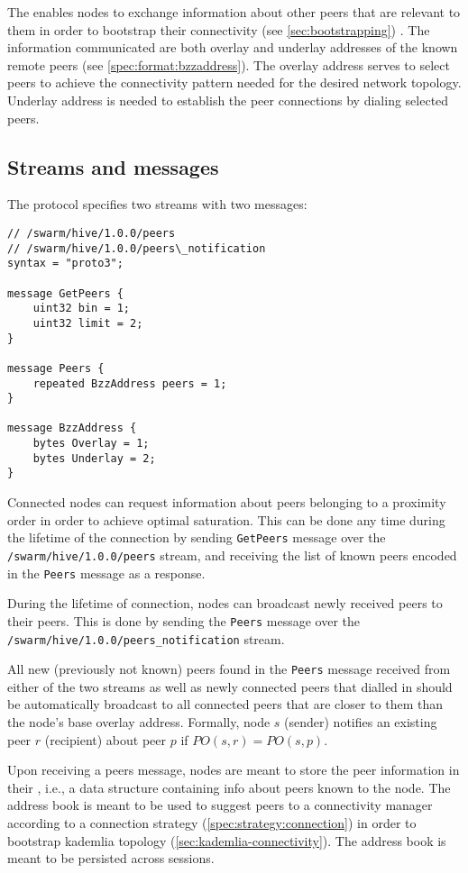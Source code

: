 The  enables nodes to exchange information about other peers that are relevant to them in order to bootstrap their connectivity  (see \ref{sec:bootstrapping}) . The information communicated are both overlay and underlay addresses of the known remote peers (see  \ref{spec:format:bzzaddress}). The overlay address serves to select peers to achieve the connectivity pattern needed for the desired network topology. Underlay address is needed to establish the peer connections by dialing selected peers.

\subsection{Streams and messages}

The protocol specifies two streams with two messages:

\begin{lstlisting}[basicstyle=\ttfamily]
// /swarm/hive/1.0.0/peers
// /swarm/hive/1.0.0/peers\_notification
syntax = "proto3";

message GetPeers {
    uint32 bin = 1;       
    uint32 limit = 2;
}

message Peers {
    repeated BzzAddress peers = 1;
}

message BzzAddress {
    bytes Overlay = 1;
    bytes Underlay = 2;
}
\end{lstlisting}

Connected nodes can request information about peers belonging to a proximity order in order to achieve optimal saturation. This can be done any time during the lifetime of the connection by sending \texttt{GetPeers} message over the \texttt{/swarm/hive/1.0.0/peers} stream, and receiving the list of known peers encoded in the \texttt{Peers} message as a response.

During the lifetime of connection, nodes can broadcast newly received peers to their peers. This is done by sending the \texttt{Peers} message over the \texttt{/swarm/hive/1.0.0/peers\_notification} stream.

All new (previously not known) peers found in the \texttt{Peers} message received from either of the two streams as well as newly connected peers that dialled in should be automatically broadcast to all connected peers that are closer  to them than the node's base overlay address. Formally, 
node $s$ (sender) notifies an existing peer $r$ (recipient) about peer $p$ if $\mathit{PO}(s, r) = \mathit{PO}(s, p)$. 

Upon receiving a peers message, nodes are meant to store the peer information in their , i.e., a data structure containing info about peers known to the node. The address book is meant to be used to suggest peers  to a connectivity manager according to a connection strategy (\ref{spec:strategy:connection}) in order to bootstrap kademlia topology (\ref{sec:kademlia-connectivity}). The address book is meant to be persisted across sessions.

